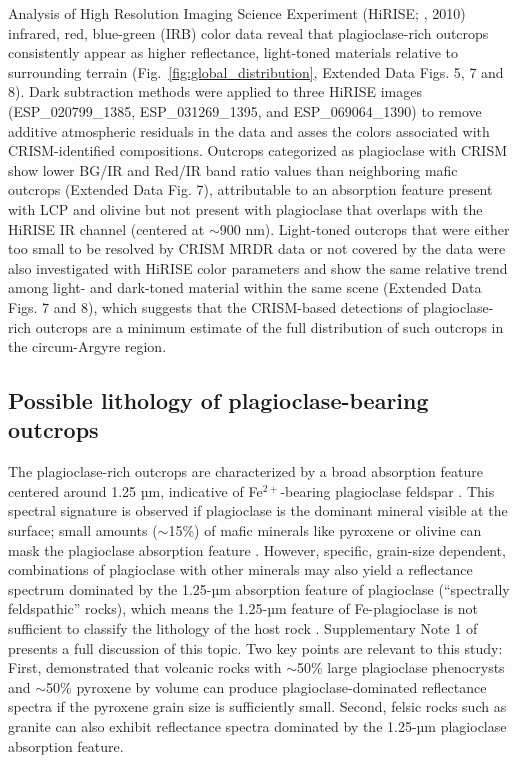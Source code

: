 \documentclass[12pt]{article}
\begin{document}
Analysis of High Resolution Imaging Science Experiment (HiRISE; \citeauthor{McEwen2010}, 2010)  infrared, red, blue-green (IRB) color data reveal that plagioclase-rich outcrops consistently appear as higher reflectance, light-toned materials relative to surrounding terrain (Fig.~\ref{fig:global_distribution}, Extended Data Figs. 5, 7 and 8). Dark subtraction methods \citep{Tornabene2018} were applied to three HiRISE images (ESP\_020799\_1385, ESP\_031269\_1395, and ESP\_069064\_1390) to remove additive atmospheric residuals in the data and asses the colors associated with CRISM-identified compositions. Outcrops categorized as plagioclase with CRISM show lower BG/IR and Red/IR band ratio values than neighboring mafic outcrops (Extended Data Fig. 7), attributable to an absorption feature present with LCP and olivine but not present with plagioclase that overlaps with the HiRISE IR channel (centered at $\sim$900 nm). Light-toned outcrops that were either too small to be resolved by CRISM MRDR data or not covered by the data were also investigated with HiRISE color parameters and show the same relative trend among light- and dark-toned material within the same scene (Extended Data Figs. 7 and 8), which suggests that the CRISM-based detections of plagioclase-rich outcrops are a minimum estimate of the full distribution of such outcrops in the circum-Argyre region.

\subsection*{Possible lithology of plagioclase-bearing outcrops}

The plagioclase-rich outcrops are characterized by a broad absorption feature centered around 1.25 µm, indicative of Fe$^{2+}$-bearing plagioclase feldspar \citep{Adams1967, Adams1973, Adams1978}. This spectral signature is observed if plagioclase is the dominant mineral visible at the surface; small amounts ($\sim$15\%) of mafic minerals like pyroxene or olivine can mask the plagioclase absorption feature \citep{Crown1987, Pompilio2007, Serventi2013, Serventi2015, Cheek2014}. However, specific, grain-size dependent, combinations of plagioclase with other minerals may also yield a reflectance spectrum dominated by the 1.25-µm absorption feature of plagioclase (``spectrally feldspathic'' rocks), which means the 1.25-µm feature of Fe-plagioclase is not sufficient to classify the lithology of the host rock \citep{Rogers2015, Barthez2023, Vannier2024}. Supplementary Note 1 of \citet{Phillips2022} presents a full discussion of this topic. Two key points are relevant to this study: First, \citet{Rogers2015} demonstrated that volcanic rocks with $\sim$50\% large plagioclase phenocrysts and $\sim$50\% pyroxene by volume can produce plagioclase-dominated reflectance spectra if the pyroxene grain size is sufficiently small. Second, felsic rocks such as granite can also exhibit reflectance spectra dominated by the 1.25-µm plagioclase absorption feature.
\end{document}
